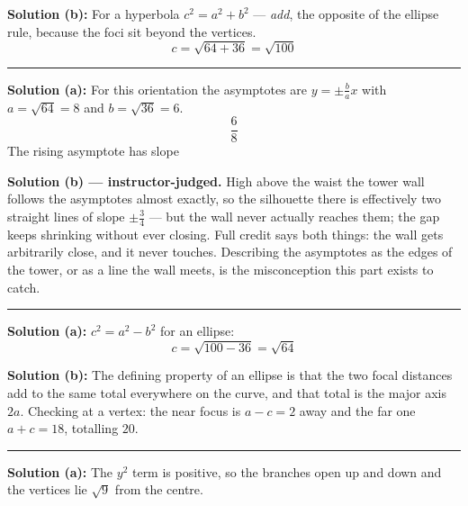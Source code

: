 \documentclass[12pt]{article}
\begin{document}
\textbf{Solution (b):} For a hyperbola $c^2 = a^2 + b^2$ --- \emph{add}, the opposite of the
ellipse rule, because the foci sit beyond the vertices.
\[ c = \sqrt{64 + 36} = \sqrt{100} \]

\vspace{0.2cm}\noindent\rule{\linewidth}{0.2pt}


\textbf{Solution (a):} For this orientation the asymptotes are $y = \pm\frac{b}{a}x$ with
$a = \sqrt{64} = 8$ and $b = \sqrt{36} = 6$.
\[ \frac{6}{8} \]
The rising asymptote has slope 

\vspace{0.15cm}
\textbf{Solution (b) --- instructor-judged.} High above the waist the tower wall follows the
asymptotes almost exactly, so the silhouette there is effectively two straight lines of slope
$\pm\frac{3}{4}$ --- but the wall never actually reaches them; the gap keeps shrinking without
ever closing. Full credit says both things: the wall gets arbitrarily close, and it never
touches. Describing the asymptotes as the edges of the tower, or as a line the wall meets,
is the misconception this part exists to catch.

\vspace{0.2cm}\noindent\rule{\linewidth}{0.2pt}


\textbf{Solution (a):} $c^2 = a^2 - b^2$ for an ellipse:
\[ c = \sqrt{100 - 36} = \sqrt{64} \]

\textbf{Solution (b):} The defining property of an ellipse is that the two focal distances
add to the same total everywhere on the curve, and that total is the major axis $2a$.
Checking at a vertex: the near focus is $a - c = 2$ away and the far one $a + c = 18$,
totalling $20$. 

\vspace{0.2cm}\noindent\rule{\linewidth}{0.2pt}


\textbf{Solution (a):} The $y^2$ term is positive, so the branches open up and down and the
vertices lie $\sqrt{9}$ from the centre. 
\end{document}
